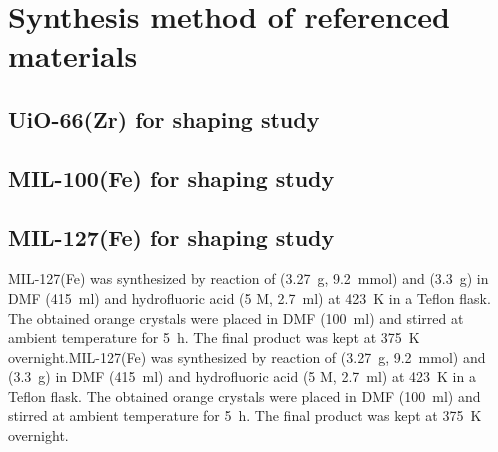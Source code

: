 
\graphicspath{ {\thisappx/figures/} }

\chapter{Synthesis method of referenced materials}%
\label{appx:synthesis}

\section{UiO-66(Zr) for shaping study}

\section{MIL-100(Fe) for shaping study}

\section{MIL-127(Fe)  for shaping study}

MIL-127(Fe) was synthesized by reaction of
 (\SI{3.27}{\gram}, \SI{9.2}{\milli\mol}) and 
 (\SI{3.3}{\gram}) in DMF
(\SI{415}{\milli\litre}) and hydrofluoric acid (5 M, \SI{2.7}{\milli\litre}) at 
\SI{423}{\kelvin} in a Teflon
flask. The obtained orange crystals were placed in DMF (\SI{100}{\milli\litre})
and stirred at ambient temperature for \SI{5}{\hour}. The final product was
kept at \SI{375}{\kelvin} overnight.MIL-127(Fe) was synthesized by reaction of
 (\SI{3.27}{\gram}, \SI{9.2}{\milli\mol}) and 
 (\SI{3.3}{\gram}) in DMF
(\SI{415}{\milli\litre}) and hydrofluoric acid (5 M, \SI{2.7}{\milli\litre}) at 
\SI{423}{\kelvin} in a Teflon 
flask. The obtained orange crystals were placed in DMF (\SI{100}{\milli\litre})
and stirred at ambient temperature for \SI{5}{\hour}. The final product was
kept at \SI{375}{\kelvin} overnight.